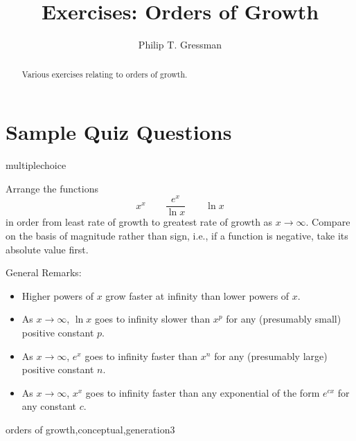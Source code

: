 \documentclass{ximera}
\title{Exercises: Orders of Growth}
\author{Philip T. Gressman}
\begin{document}
\begin{abstract}
Various exercises relating to orders of growth.
\end{abstract}
\maketitle

\section*{Sample Quiz Questions}

\begin{question}[GrowthOrdINF001]
\begin{type}
multiplechoice
\end{type}
Arrange the functions 
\[ x^{x} \qquad \frac{e^{x}}{\ln{x}} \qquad \ln{x} \]
in order from least rate of growth to greatest rate of growth as \(x \rightarrow \infty\). Compare on the basis of magnitude rather than sign, i.e., if a function is negative, take its absolute value first.
\begin{multiplechoice}
 \choicebreak
{}
\end{multiplechoice}
\begin{feedback}
General Remarks:
\begin{itemize} \item Higher powers of \(x\) grow faster at infinity than lower powers of \(x\).
\item As \(x \rightarrow \infty\), \(\ln x\) goes to infinity slower than \(x^p\) for any (presumably small) positive constant \(p\).
\item As \(x \rightarrow \infty\), \(e^x\) goes to infinity faster than \(x^n\) for any (presumably large) positive constant \(n\).
\item As \(x \rightarrow \infty\), \(x^x\) goes to infinity faster than any exponential of the form \(e^{cx}\) for any constant \(c\).
\end{itemize}
\end{feedback}
\begin{keywords}
orders of growth,conceptual,generation3
\end{keywords}
\end{question}
\end{document}
